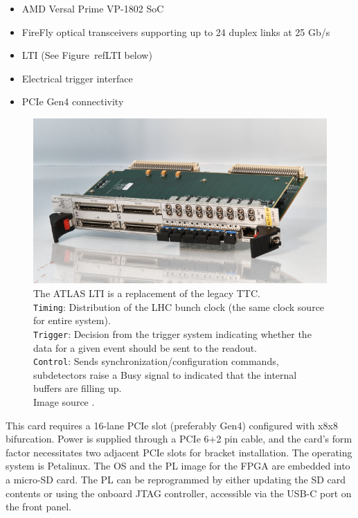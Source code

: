 \begin{itemize}
    \item AMD Versal Prime VP-1802 \acf{SoC}
    \item FireFly optical transceivers supporting up to 24 duplex links at 25 Gb/s \cite{firefly-optical-transceiver}
    \item \acf{LTI} (See Figure~ref{LTI} below)
    \item Electrical trigger interface
    \item \acs{PCIe} Gen4 connectivity
\end{itemize}

\begin{figure}[htbp]
\centering
\includegraphics[width=\textwidth]{images/felix/lti.jpg}
\caption[LTI]{The ATLAS \acf{LTI} is a replacement of the legacy \acf{TTC}.\\ \texttt{Timing}: Distribution of the \acs{LHC} bunch clock (the same clock source for entire system).\\\texttt{Trigger}: Decision from the trigger system indicating whether the data for a given event should be sent to the readout.\\ \texttt{Control}: Sends synchronization/configuration commands, subdetectors raise a Busy signal to indicated that the internal buffers are filling up.\\Image source \protect\cite{lti}.}
\label{fig:LTI}
\end{figure}

This card requires a 16-lane \acs{PCIe} slot (preferably Gen4) configured with x8x8 bifurcation. Power is supplied through a \acs{PCIe} 6+2 pin cable, and the card's form factor necessitates two adjacent \acs{PCIe} slots for bracket installation. 
The operating system is Petalinux. The OS and the \acl{PL} image for the \acs{FPGA} are embedded into a micro-SD card. The \acs{PL} can be reprogrammed by either updating the SD card contents or using the onboard \ac{JTAG} controller, accessible via the USB-C port on the front panel.

